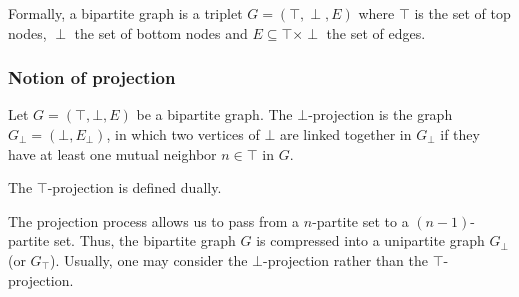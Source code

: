 \documentclass[table]{report}
\begin{document}
Formally, a bipartite graph is a triplet $G = (\top, \perp, E)$ where $\top$ is the set of top nodes, $\perp$ the set of bottom nodes and $E \subseteq \top \times \perp$ the set of edges. 



%

%

%

%
%


%
%
%
% 
%
%
%


\subsubsection{Notion of projection}

Let $G = (\top, \bot, E)$ be a bipartite graph. 
The $\bot$-projection is the graph $G_{\bot}=(\bot, E_{\bot})$, in which two vertices of $\bot$ are linked together in  $G_{\bot}$ if they have at least one mutual neighbor $n \in \top$ in $G$.

The $\top$-projection is defined dually. 

\medbreak
The projection process allows us to pass from a $n$-partite set to a $(n-1)$-partite set. Thus, the bipartite graph $G$ is compressed into a unipartite graph $G_{\bot}$ (or $G_{\top}$). Usually, one may consider the $\bot$-projection rather than the $\top$-projection.
\end{document}
